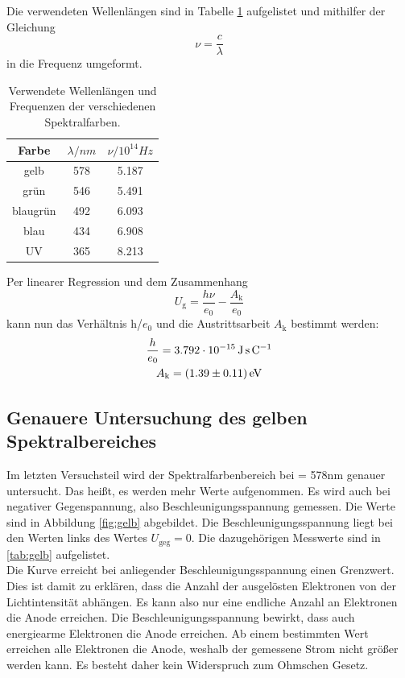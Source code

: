 \documentclass[
  bibliography=totoc,     %
  captions=tableheading,  %
  titlepage=firstiscover, %
]{scrartcl}
\begin{document}
Die verwendeten Wellenlängen sind in Tabelle \ref{tab:Längen} aufgelistet und mithilfer der Gleichung
\begin{equation*}
	\nu = \frac{c}{\lambda}
\end{equation*}
in die Frequenz \nu umgeformt.

\begin{table} [H]
	\centering
	\caption{Verwendete Wellenlängen und Frequenzen der verschiedenen Spektralfarben.}
	\label{tab:Längen}
	\begin{tabular}{c|cc}
		\toprule
		{Farbe}&{$\lambda / nm$}&{$\nu / 10^{14} Hz$} \\
		\midrule
		gelb&578&5.187\\
		grün&546&5.491\\
		blaugrün&492&6.093\\
		blau&434&6.908\\
		UV&365&8.213\\
		\bottomrule 
	\end{tabular}
\end{table} 

Per linearer Regression und dem Zusammenhang 
\begin{equation*}
	U_\text{g} = \frac{h\nu}{e_0} - \frac{A_\text{k}}{e_0}
\end{equation*}
kann nun das Verhältnis h/$e_0$ und die Austrittsarbeit $A_\text{k}$ bestimmt werden:
\begin{gather*}
	\frac{h}{e_0} = \SI{3.792e-15}{\joule\second\per\coulomb}\\
	A_\text{k} = \SI{1.39 \pm 0.11}{eV}
\end{gather*}

\subsection{Genauere Untersuchung des gelben Spektralbereiches}

Im letzten Versuchsteil wird der Spektralfarbenbereich bei \lambda = 578nm genauer untersucht. Das heißt, es werden mehr Werte aufgenommen. Es wird auch bei negativer Gegenspannung, also Beschleunigungsspannung gemessen.
Die Werte sind in Abbildung \ref{fig:gelb} abgebildet. Die Beschleunigungsspannung liegt bei den Werten links des Wertes $U_\text{geg} = 0$. Die dazugehörigen Messwerte sind in \ref{tab:gelb} aufgelistet. \\
Die Kurve erreicht bei anliegender Beschleunigungsspannung einen Grenzwert. Dies ist damit zu erklären, dass die Anzahl der ausgelösten Elektronen von der Lichtintensität abhängen. Es kann also nur eine endliche Anzahl an Elektronen die Anode erreichen. Die Beschleunigungsspannung bewirkt, dass auch energiearme Elektronen die Anode erreichen. Ab einem bestimmten Wert erreichen alle Elektronen die Anode, weshalb der gemessene Strom nicht größer werden kann. Es besteht daher kein Widerspruch zum Ohmschen Gesetz. \\
\end{document}
